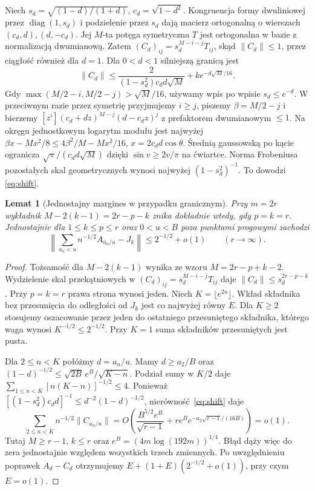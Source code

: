 \documentclass[11pt,a4paper,reqno]{amsart}
\newtheorem{lemma}[theorem]{Lemat}
\numberwithin{equation}{section}
\begin{document}
Niech \(s_d=\sqrt{(1-d)/(1+d)}\), \(c_d=\sqrt{1-d^2}\). Kongruencja formy dwuliniowej przez \(\operatorname{diag}(1,s_d)\) i podzielenie przez \(s_d\) dają macierz ortogonalną o wierszach \((c_d,d),(d,-c_d)\). Jej \(M\)-ta potęga symetryczna \(T\) jest ortogonalna w bazie z normalizacją dwumianową. Zatem \((C_d)_{ij}=s_d^{M-i-j}T_{ij}\), skąd \(\|C_d\|\le1\), przez ciągłość również dla \(d=1\). Dla \(0<d<1\) silniejszą granicą jest 
\begin{equation}\label{eq:shift}
\|C_d\|\le \frac{2}{(1-s_d^2)c_d d\sqrt M}+k e^{-d\sqrt M/16}.
\end{equation}
 Gdy \(\max(M/2-i,M/2-j)>\sqrt M/16\), używamy wpis po wpisie \(s_d\le e^{-d}\). W przeciwnym razie przez symetrię przyjmujemy \(i\ge j\), piszemy \(\beta=M/2-j\) i bierzemy \([z^i](c_d+dz)^{M-j}(d-c_dz)^j\) z prefaktorem dwumianowym \(\le1\). Na okręgu jednostkowym logarytm modułu jest najwyżej \(\beta x-Mx^2/8\le4\beta^2/M-Mx^2/16\), \(x=2c_d d\cos\theta\). Średnią gaussowską po kącie ogranicza \(\sqrt{\pi}/(c_d d\sqrt M)\) dzięki \(\sin v\ge2v/\pi\) na ćwiartce. Norma Frobeniusa pozostałych skal geometrycznych wynosi najwyżej \((1-s_d^2)^{-1}\). To dowodzi \eqref{eq:shift}.

\begin{lemma}[Jednostajny margines w przypadku granicznym]\label{lem:critical}
Przy \(m=2r\) wykładnik \(M-2(k-1)=2r-p-k\) znika dokładnie wtedy, gdy \(p=k=r\). Jednostajnie dla \(1\le k\le p\le r\) oraz \(0<u<B\) poza punktami progowymi zachodzi
\[
 \left\|\sum_{a_n<u} n^{-1/2} A_{a_n/u}-J_k\right\|
 \le 2^{-1/2}+o(1) \qquad(r\to\infty).
\]
\end{lemma}
\begin{proof}
Tożsamość dla \(M-2(k-1)\) wynika ze wzoru \(M=2r-p+k-2\). Wydzielenie skal przekątniowych w \((C_d)_{ij}=s_d^{M-i-j}T_{ij}\) daje \(\|C_d\|\le s_d^{2r-p-k}\). Przy \(p=k=r\) prawa strona wynosi jeden. Niech \(K=\lfloor e^{2u}\rfloor\). Wkład składnika bez przesunięcia do odległości od \(J_k\) jest co najwyżej równy \(E\). Dla \(K\ge2\) stosujemy oszacowanie przez jeden do ostatniego przesuniętego składnika, którego waga wynosi \(K^{-1/2}\le2^{-1/2}\). Przy \(K=1\) suma składników przesuniętych jest pusta.

Dla \(2\le n<K\) połóżmy \(d=a_n/u\). Mamy \(d\ge a_2/B\) oraz \((1-d)^{-1/2}\le\sqrt{2B}\,e^B/\sqrt{K-n}\). Podział sumy w \(K/2\) daje \(\sum_{1\le n<K}[n(K-n)]^{-1/2}\le4\). Ponieważ \([(1-s_d^2)c_dd]^{-1}\le d^{-2}(1-d)^{-1/2}\), nierówność~\eqref{eq:shift} daje
\[
 \sum_{2\le n<K} n^{-1/2}\|C_{a_n/u}\|
 =O\!\left(\frac{B^{5/2}e^B}{\sqrt{r-1}}
       +re^B e^{-a_2\sqrt{r-1}/(16B)}\right)=o(1).
\]
Tutaj \(M\ge r-1\), \(k\le r\) oraz \(e^B=(4m\log(192m))^{1/4}\). Błąd dąży więc do zera jednostajnie względem wszystkich trzech zmiennych. Po uwzględnieniu poprawek \(A_d-C_d\) otrzymujemy \(E+(1+E)(2^{-1/2}+o(1))\), przy czym \(E=o(1)\).
\end{proof}
\end{document}
